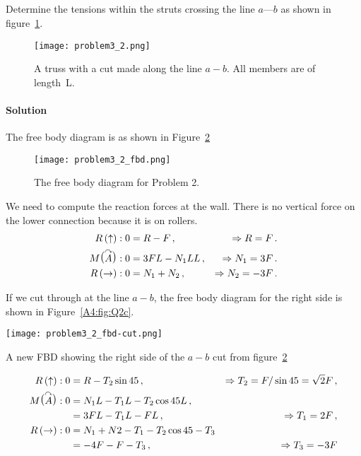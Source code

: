 \documentclass[a4paper,justified,oneside]{tufte-handout}
\numberwithin{equation}{subsection}
\begin{document}
\subsection{}
Determine the tensions within the struts crossing the line $a$---$b$ as shown in figure~\ref{A4:fig:Q2a}.
\begin{figure}
	\centering
	\texttt{[image: problem3\_2.png]}
	\caption{A truss with a cut made along the line $a-b$. All members are of length~L.}
	\label{A4:fig:Q2a}
\end{figure}

\begin{solution}
\paragraph{Solution}
The free body diagram is as shown in Figure~\ref{A4:fig:Q2b}
\begin{figure}
	\centering
	\texttt{[image: problem3\_2\_fbd.png]}
	\caption{The free body diagram for Problem 2.}
	\label{A4:fig:Q2b}
\end{figure}

We need to compute the reaction forces at the wall. There is no vertical force on the lower connection because it is on rollers.
\begin{align*}
	R\left(\uparrow\right)															: 0	&=R-F\,,					&\Rightarrow R=F\,. \\
	M\raisebox{1.5pt}{\big(}\overset{\curvearrowright}{A}\raisebox{1.5pt}{\big)}	: 0	&=3F L -N_1 LL\,,			&	\Rightarrow N_1 = 3F\,.\\
	R\left(\rightarrow\right)														: 0	&=N_1 + N_2\,,				&	\Rightarrow N_2 = -3F\,.	\\
\end{align*}

If we cut through at the line $a-b$, the free body diagram for the right side is shown in Figure~\ref{A4:fig:Q2c}.
\begin{marginfigure}
	\centering
	\texttt{[image: problem3\_2\_fbd-cut.png]}
	\caption{A new FBD showing the right side of the $a-b$ cut from figure~\protect\ref{A4:fig:Q2b}}
	\label{A4:fig:Q2c}
\end{marginfigure}

\begin{align*}
	R\left(\uparrow\right)															: 0	&=R-T_2 \sin 45\,,						&\Rightarrow T_2 = F/ \sin 45=\sqrt{2}F\,, \\
	M\raisebox{1.5pt}{\big(}\overset{\curvearrowright}{A}\raisebox{1.5pt}{\big)}	: 0	&=N_1 L -T_1 L-T_2 \cos 45 L\,,			&	\\
	&=3FL-T_1L-FL\,,						&\Rightarrow T_1 =2F\,,\\
	R\left(\rightarrow\right)														: 0	&=N_1 + N2 - T_1 - T_2 \cos 45 - T_3	&	\\
	&=-4F-F-T_3\,, 							&\Rightarrow T_3 = -3F
\end{align*}
\clearpage
\end{solution}
\end{document}
